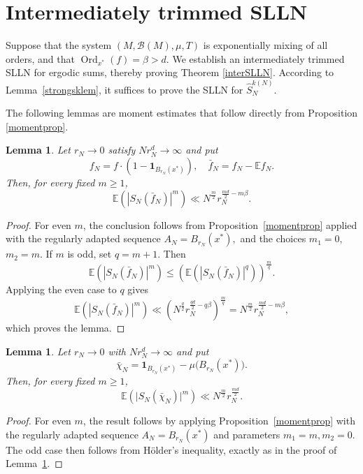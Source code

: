 \documentclass[11pt,twoside,a4paper,reqno]{amsart}
\newtheorem{lemma}[theorem]{Lemma}
\newcommand{\Ord}{\operatorname{Ord}}
\newcommand{\E}{\mathbb{E}}
\def\one{{\mathbf{1}}}
\begin{document}
\section{Intermediately trimmed SLLN}\label{IT}
Suppose that the system $(M, \mathcal{B}(M), \mu, T)$ is exponentially mixing of all orders, and that $\Ord_{x^*}(f) = \beta > d$. We establish an intermediately trimmed SLLN for ergodic sums, thereby proving Theorem \ref{interSLLN}. According to Lemma~\ref{strongsklem}, it suffices to prove the SLLN for $\hat{S}_N^{k(N)}$.

The following lemmas are moment estimates that follow directly from Proposition \ref{momentprop}.

\begin{lemma}\label{momentlem}
Let $r_N\to0$ satisfy $N r_N^{d} \rightarrow \infty$ and put
$$f_N=f \cdot \left(1-\one_{B_{r_N}(x^*)}\right),\quad\bar{f}_N=f_N-\E f_N.
$$
Then, for every fixed $m\ge 1$,
$$
\E\left( \left|S_N(\bar{f}_N)\right|^m \right) \ll N^{\frac{m}{2}} r_N^{\frac{md}{2}-m\beta}.
$$
\end{lemma}


\begin{proof}
For even $m$, the conclusion follows from Proposition~\ref{momentprop} applied with the regularly adapted sequence $A_N=B_{r_N}(x^*),$ and the choices $m_1=0,$ $m_2=m.$
If $m$ is odd, set $q=m+1$. Then
$$\E\left(\left|S_N(\bar f_N)\right|^m\right)\le
\left(\E\left(\left|S_N(\bar f_N)\right|^q\right)\right)^{\frac{m}{q}}.
$$
Applying the even case to $q$ gives
$$\E\left(\left|S_N(\bar f_N)\right|^m\right)\ll\left(N^{\frac{q}{2}} r_N^{\frac{qd}{2}-q\beta}\right)^{\frac{m}{q}}=N^{\frac{m}{2}} r_N^{\frac{md}{2}-m\beta},$$
which proves the lemma.
\end{proof}





\begin{lemma}\label{momentlemind}
Let $r_N\to0$ with $N r_N^{d} \rightarrow \infty$ and put
$$\bar{\chi}_N=\one_{B_{r_N}(x^*)}-\mu\bigl(B_{r_N}(x^*)\bigr).$$
Then, for every fixed $m\ge1$,
\begin{equation*}
\E\left(\bigl|S_N(\bar{\chi}_N)\bigr|^m\right) \ll N^{\frac{m}{2}} r_N^{\frac{md}{2}}.
\end{equation*}
\end{lemma}

\begin{proof}
For even $m$, the result follows by applying Proposition~\ref{momentprop} with the regularly adapted sequence $A_N=B_{r_N}(x^*)$ and parameters $m_1=m,m_2=0$. The odd case then follows from H\"{o}lder's inequality, exactly as in the proof of Lemma~\ref{momentlem}.
\end{proof}
\end{document}
